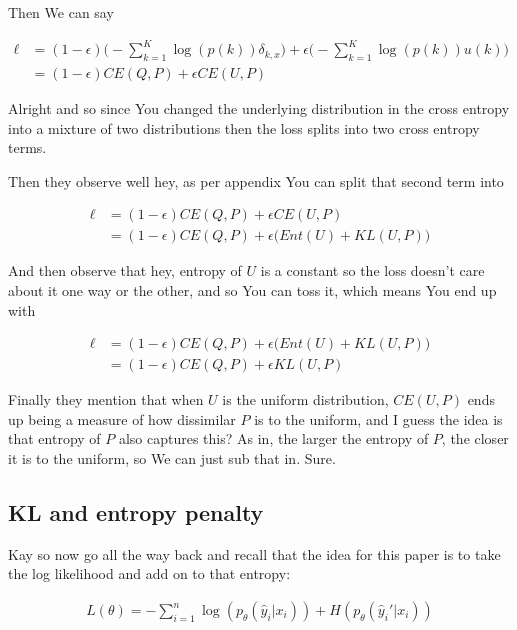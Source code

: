 \documentclass{article}
\begin{document}
		Then We can say
		
		\begin{align}
			\ell &= (1-\epsilon)\bigg(-\sum^K_{k=1} \log(p(k))\delta_{k, x}\bigg) +\epsilon \bigg(-\sum^K_{k=1} \log(p(k))u(k) \bigg)\\
			&= (1-\epsilon)CE(Q, P) +\epsilon CE(U, P)
		\end{align}
		
		Alright and so since You changed the underlying distribution in the cross entropy into a mixture of two distributions then the loss splits into two cross entropy terms. 
		
		Then they observe well hey, as per appendix You can split that second term into
		
		\begin{align}
			\ell &= (1-\epsilon)CE(Q, P) +\epsilon CE(U, P)\\
			&= (1-\epsilon)CE(Q, P) +\epsilon \big( Ent(U) + KL(U, P) \big)
		\end{align}
		
		And then observe that hey, entropy of $U$ is a constant so the loss doesn't care about it one way or the other, and so You can toss it, which means You end up with 
		
		\begin{align}
			\ell &= (1-\epsilon)CE(Q, P) +\epsilon \big( Ent(U) + KL(U, P) \big)\\
			&= (1-\epsilon)CE(Q, P) +\epsilon KL(U, P)
		\end{align}
		
		Finally they mention that when $U$ is the uniform distribution, $CE(U, P)$ ends up being a measure of how dissimilar $P$ is to the uniform, and I guess the idea is that entropy of $P$ also captures this? As in, the larger the entropy of $P$, the closer it is to the uniform, so We can just sub that in. Sure.
		
	\subsection{KL and entropy penalty}
	
		Kay so now go all the way back and recall that the idea for this paper is to take the log likelihood and add on to that entropy:
		
		\begin{align}
			L(\theta) = -\sum^n_{i=1} \log(p_\theta(\hat{y}_i|x_i)) + H(p_\theta(\hat{y}_i'|x_i))
		\end{align}
		
\end{document}
